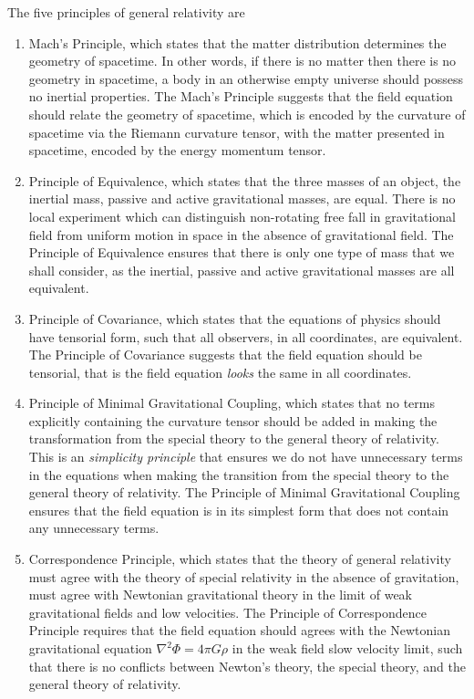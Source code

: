 \documentclass[11pt, onesided]{book}
\theoremstyle{break}
\theoremstyle{break}
\begin{document}
The five principles of general relativity are
\begin{enumerate}
\item Mach’s Principle, which states that the matter distribution determines the geometry of spacetime. In other words, if there is no matter then there is no geometry in spacetime, a body in an otherwise empty universe should possess no inertial properties. The Mach's Principle suggests that the field equation should relate the geometry of spacetime, which is encoded by the curvature of spacetime via the Riemann curvature tensor, with the matter presented in spacetime, encoded by the energy momentum tensor.
\item Principle of Equivalence, which states that the three masses of an object, the inertial mass, passive and active gravitational masses, are equal. There is no local experiment which can distinguish non-rotating free fall in gravitational field from uniform motion in space in the absence of gravitational field. The Principle of Equivalence ensures that there is only one type of mass that we shall consider, as the inertial, passive and active gravitational masses are all equivalent.
\item Principle of Covariance, which states that the equations of physics should have tensorial form, such that all observers, in all coordinates, are equivalent. The Principle of Covariance suggests that the field equation should be tensorial, that is the field equation \textit{looks} the same in all coordinates.
\item Principle of Minimal Gravitational Coupling, which states that no terms explicitly containing the curvature tensor should be added in making the transformation from the special theory to the general theory of relativity. This is an \textit{simplicity principle} that ensures we do not have unnecessary terms in the equations when making the transition from the special theory to the general theory of relativity. The Principle of Minimal Gravitational Coupling ensures that the field equation is in its simplest form that does not contain any unnecessary terms. 
\item Correspondence Principle, which states that the theory of general relativity must agree with the theory of special relativity in the absence of gravitation, must agree with Newtonian gravitational theory in the limit of weak gravitational fields and low velocities. The Principle of Correspondence Principle requires that the field equation should agrees with the Newtonian gravitational equation $\nabla^2 \Phi = 4\pi G\rho$ in the weak field slow velocity limit, such that there is no conflicts between Newton's theory, the special theory, and the general theory of relativity.
\end{enumerate}
\end{document}
